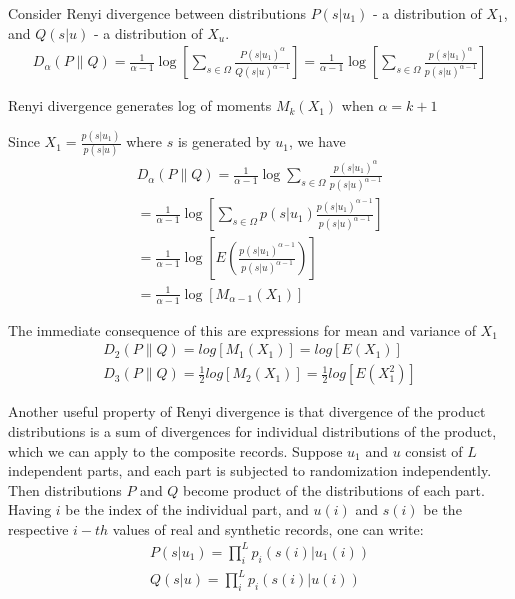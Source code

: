 \documentclass[11pt]{article}
\begin{document}
Consider Renyi divergence between distributions $P(s|u_1)$ - a distribution of $X_1$, and $Q(s|u)$ - a distribution of $X_u$.
\begin{align}
D_{\alpha} (P \parallel Q ) = \frac{1}{\alpha - 1} \log \left [ \sum_{s \in \Omega} \frac{P(s|u_1)^{\alpha}}{ Q(s|u)^{\alpha-1} } \right ] =  \frac{1}{\alpha - 1} \log \left [ \sum_{s \in \Omega} \frac{p(s|u_1)^{\alpha}}{ p(s|u)^{\alpha-1} } \right ] 
\end{align}

\begin{lem}
Renyi divergence generates log of moments $M_k(X_1)$ when $\alpha = k+1$
\end{lem}
\begin{pf}

Since $X_1 =   \frac{p(s|u_1)}{p(s|u)}$  where $s$ is generated by $u_1$, we have
\begin{align}
D_{\alpha} (P \parallel Q ) =   \frac{1}{\alpha - 1} \log \sum_{s \in \Omega} \frac{p(s|u_1)^{\alpha}}{ p(s|u)^{\alpha-1} } \\
= \frac{1}{\alpha-1} \log \left [ \sum_{s \in \Omega} p(s|u_1) \frac{p(s|u_1)^{\alpha-1}}{ p(s|u)^{\alpha-1} } \right ] \\
=   \frac{1}{\alpha-1} \log \left [ E \left ( \frac{p(s|u_1)^{\alpha-1}}{ p(s|u)^{\alpha-1} } \right ) \right ] \\
=  \frac{1}{\alpha-1} \log [M_{\alpha-1}(X_1)] 
\end{align}
\end{pf}

The immediate consequence of this are expressions for mean and variance of $X_1$
 \begin{align}
 D_2 (P \parallel Q )  =  log [M_{1}(X_1)] = log[ E(X_1) ] \\
 D_3 (P \parallel Q )  = \frac{1}{2} log [M_{2}(X_1)] = \frac{1}{2} log[ E(X_1^2) ]
 \end{align}

Another useful property of Renyi divergence is that divergence of the product distributions is a sum of divergences for individual distributions of the product, which we can apply to the composite records.  Suppose  $u_1$ and $u$ consist of $L$ independent parts, and each part is subjected to randomization independently.  Then distributions $P$ and $Q$ become product of the distributions of each part.  Having $i$ be the index of the individual part, and $u(i)$ and $s(i)$ be the respective $i-th$ values of real and synthetic records, one can write:
 \begin{align}
 P(s|u_1) = \prod_{i}^L p_i(s(i) | u_1(i))  \\
 Q(s|u) =  \prod_{i}^L p_i(s(i) | u(i)) 
\end{align}
\end{document}
